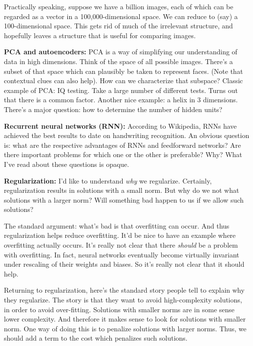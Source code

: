 \documentclass[12pt]{report}
\begin{document}
Practically speaking, suppose we have a billion images, each of which
can be regarded as a vector in a 100,000-dimensional space.  We can
reduce to (say) a 100-dimensional space.  This gets rid of much of the
irrelevant structure, and hopefully leaves a structure that is useful
for comparing images.

\textbf{PCA and autoencoders:} PCA is a way of simplifying our
understanding of data in high dimensions.  Think of the space of all
possible images.  There's a subset of that space which can plausibly
be taken to represent faces.  (Note that contextual clues can also
help).  How can we characterize that subspace?  Classic example of
PCA: IQ testing.  Take a large number of different tests.  Turns out
that there is a common factor.  Another nice example: a helix in 3
dimensions.  There's a major question: how to determine the number of
hidden units?

\textbf{Recurrent neural networks (RNN):} According to Wikipedia, RNNs
have achieved the best results to date on handwriting recognition.  An
obvious question is: what are the respective advantages of RNNs and
feedforward networks?  Are there important problems for which one or
the other is preferable?  Why?  What I've read about these questions
is opaque.

\textbf{Regularization:} I'd like to understand \emph{why} we
regularize.  Certainly, regularization results in solutions with a
small norm.  But why do we not what solutions with a larger norm?
Will something bad happen to us if we allow such solutions?

The standard argument: what's bad is that overfitting can occur.  And
thus regularization helps reduce overfitting.  It'd be nice to have an
example where overfitting actually occurs.  It's really not clear that
there \emph{should} be a problem with overfitting.  In fact, neural
networks eventually become virtually invariant under rescaling of
their weights and biases.  So it's really not clear that it should
help.

Returning to regularization, here's the standard story people tell to
explain why they regularize.  The story is that they want to avoid
high-complexity solutions, in order to avoid over-fitting.  Solutions
with smaller norms are in some sense lower complexity.  And therefore
it makes sense to look for solutions with smaller norm.  One way of
doing this is to penalize solutions with larger norms.  Thus, we
should add a term to the cost which penalizes such solutions.
\end{document}
